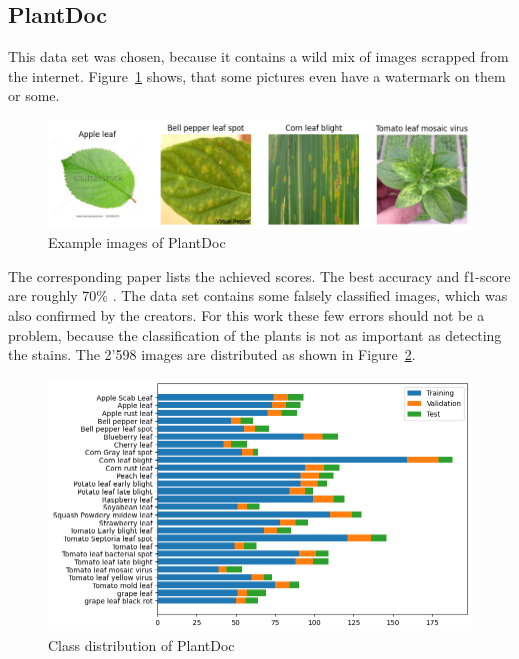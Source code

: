 \subsection{PlantDoc}
This data set was chosen, because it contains a wild mix of images scrapped from the internet. Figure~\ref{fig:example_images_of_plantdoc} shows, that some pictures even have a watermark on them or some.
\begin{figure}[H]
    \begin{center}
    \includegraphics[width=15cm]{../../images/example_images_of_plantdoc.png}
    \caption{Example images of PlantDoc}\label{fig:example_images_of_plantdoc}
    \end{center}
\end{figure}
The corresponding paper lists the achieved scores. The best accuracy and f1-score are roughly 70\% \autocite{singh2020}. The data set contains some falsely classified images, which was also confirmed by the creators. For this work these few errors should not be a problem, because the classification of the plants is not as important as detecting the stains.
The 2'598 images are distributed as shown in Figure~\ref{fig:class_distribution_of_plantdoc}.

\begin{figure}[H]
    \begin{center}
    \includegraphics[width=15cm]{../../images/class_distribution_of_plantdoc.png}
    \caption{Class distribution of PlantDoc}\label{fig:class_distribution_of_plantdoc}
    \end{center}
\end{figure}

